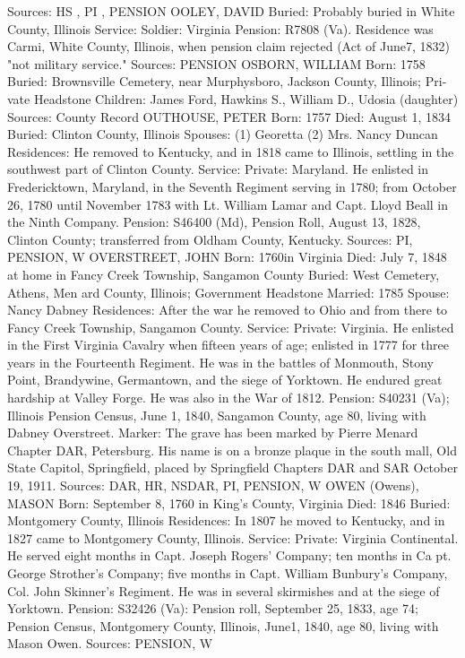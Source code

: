 Sources: HS , PI , PENSION 
OOLEY, DAVID 
Buried: Probably buried in White County, Illinois 
Service: Soldier: Virginia Pension: R7808 (Va). Residence was Carmi, White County, Illinois, when pen­sion claim rejected (Act of June7, 1832) "not military service." 
Sources: PENSION 
OSBORN, WILLIAM
Born: 1758 
Buried: Brownsville Cemetery, near Murphysboro, Jackson County, Illinois; Pri­vate Headstone
Children: James Ford, Hawkins S., William D., Udosia (daughter) 
Sources: County Record 
OUTHOUSE, PETER
Born: 1757
Died: August 1, 1834 Buried: Clinton County, Illinois 
Spouses: (1) Georetta
	 (2) Mrs. Nancy Duncan 
Residences: He removed to Kentucky, and in 1818 came to Illinois, settling in the southwest part of Clinton County. 
Service: Private: Maryland. He enlisted in Fredericktown, Maryland, in the Seventh Regiment serving in 1780; from October 26, 1780 until November 1783 with Lt. William Lamar and Capt. Lloyd Beall in the Ninth Company. 
Pension: S46400 (Md), Pension Roll, August 13, 1828, Clinton County; transferred from Oldham County, Kentucky. 
Sources: PI, PENSION, W 
OVERSTREET, JOHN
Born: 1760in Virginia
Died: July 7, 1848 at home in Fancy Creek Township, Sangamon County Buried: West Cemetery, Athens, Men ard County, Illinois; Government Headstone Married: 1785 Spouse: Nancy Dabney Residences: After the war he removed to Ohio and from there to Fancy Creek Township, Sangamon County. 
Service: Private: Virginia. He enlisted in the First Virginia Cavalry when fifteen years of age; enlisted in 1777 for three years in the Fourteenth Regiment. He was in the battles of Monmouth, Stony Point, Brandywine, Germantown, and the siege of Yorktown. He endured great hardship at Valley Forge. He was also in the War of 1812. 
Pension: S40231 (Va); Illinois Pension Census, June 1, 1840, Sangamon County, age 80, living with Dabney Overstreet. 
Marker: The grave has been marked by Pierre Menard Chapter DAR, Petersburg. His name is on a bronze plaque in the south mall, Old State Capitol, Spring­field, placed by Springfield Chapters DAR and SAR October 19, 1911. 
Sources: DAR, HR, NSDAR, PI, PENSION, W 
OWEN (Owens), MASON
Born: September 8, 1760 in King's County, Virginia
Died: 1846 
Buried: Montgomery County, Illinois 
Residences: In 1807 he moved to Kentucky, and in 1827 came to Montgomery County, Illinois. Service: Private: Virginia Continental. He served eight months in Capt. Joseph Rogers' Company; ten months in Ca pt. George Strother's Company; five months in Capt. William Bunbury's Company, Col. John Skinner's Regiment. He was in several skirmishes and at the siege of Yorktown. Pension: S32426 (Va): Pension roll, September 25, 1833, age 74; Pension Census, Montgomery County, Illinois, June1, 1840, age 80, living with Mason Owen. Sources: PENSION, W 
